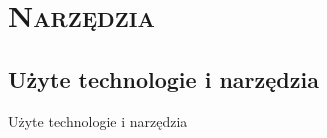 \section{\scshape Narzędzia}

\subsection{Użyte technologie i narzędzia}
\begin{frame}{Użyte technologie i narzędzia}
\end{frame}